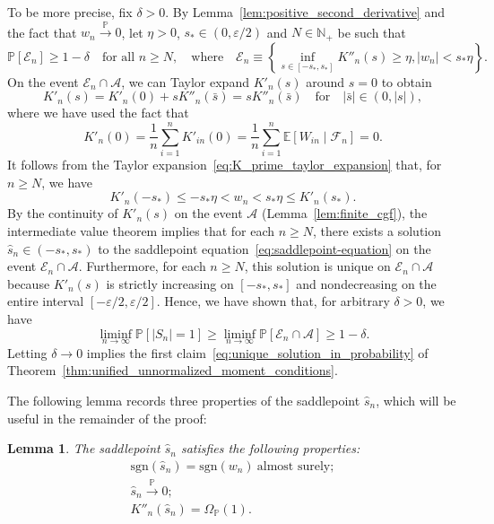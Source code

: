 \documentclass[12pt]{article}
\newtheorem{lemma}{Lemma}
\theoremstyle{definition}
\def\P{\mathbb{P}}
\def\sgn{\mathrm{sgn}}
\def\P{\mathbb{P}}
\newcommand{\E}{\mathbb E}								%
\renewcommand{\P}{\mathbb{P}}							%
\newcommand{\convp}{\overset{\mathbb{P}}{\rightarrow}}             %
\begin{document}
To be more precise, fix $\delta > 0$. By Lemma~\ref{lem:positive_second_derivative} and the fact that $w_n \convp 0$, let $\eta > 0$, $s_* \in (0, \varepsilon/2)$ and $N \in \mathbb N_+$ be such that
\begin{equation}
\P\left[\mathcal E_n\right] \geq 1-\delta \quad \text{for all } n \geq N, \quad \text{where} \quad \mathcal E_n \equiv \left\{\inf_{s \in [-s_*, s_*]} K''_n(s) \geq \eta, |w_n| < s_* \eta\right\}.
\end{equation}
On the event $\mathcal E_n \cap \mathcal A$, we can Taylor expand $K'_n(s)$ around $s = 0$ to obtain
\begin{equation}
K'_n(s) =  K'_n(0) + s K''_n(\bar s) = s K''_n(\bar s) \quad \text{for} \quad |\bar s| \in (0, |s|),
\label{eq:K_prime_taylor_expansion}
\end{equation}
where we have used the fact that
\begin{equation}
K'_n(0) = \frac{1}{n}\sum_{i = 1}^n K'_{in}(0) = \frac{1}{n}\sum_{i = 1}^n \E[W_{in} \mid \mathcal F_n] = 0. 
\label{eq:k_n_prime_0_equals_0}
\end{equation}
It follows from the Taylor expansion~\eqref{eq:K_prime_taylor_expansion} that, for $n \geq N$, we have
\begin{equation*}
K'_n(-s_*) \leq -s_* \eta < w_n < s_* \eta \leq K'_n(s_*).
\end{equation*}
By the continuity of $K'_n(s)$ on the event $\mathcal A$ (Lemma~\ref{lem:finite_cgf}), the intermediate value theorem implies that for each $n \geq N$, there exists a solution $\hat s_n \in (-s_*, s_*)$ to the saddlepoint equation~\eqref{eq:saddlepoint-equation} on the event $\mathcal E_n \cap \mathcal A$. Furthermore, for each $n \geq N$, this solution is unique on $\mathcal E_n \cap \mathcal A$ because $K'_n(s)$ is strictly increasing on $[-s_*, s_*]$ and nondecreasing on the entire interval $[-\varepsilon/2, \varepsilon/2]$. Hence, we have shown that, for arbitrary $\delta > 0$, we have
\begin{equation}
\liminf_{n \rightarrow \infty} \P[|S_n| = 1] \geq \liminf_{n \rightarrow \infty} \P[\mathcal E_n \cap \mathcal A] \geq 1 - \delta.
\end{equation}
Letting $\delta \rightarrow 0$ implies the first claim~\eqref{eq:unique_solution_in_probability} of Theorem~\ref{thm:unified_unnormalized_moment_conditions}. 

The following lemma records three properties of the saddlepoint $\hat s_n$, which will be useful in the remainder of the proof:
\begin{lemma} \label{lem:saddlepoint_properties}
The saddlepoint $\hat s_n$ satisfies the following properties:
\begin{align}
\sgn(\hat s_n)=\sgn(w_n)\ \text{almost surely} ;\label{eq:sign_property_s_n}  \\
\hat s_n \convp 0; \label{eq:hat_s_n_convergence} \\
K''_n(\hat s_n) = \Omega_{\P}(1). \label{eq:hat_s_n_second_derivative}
\end{align}
\end{lemma}
\end{document}
